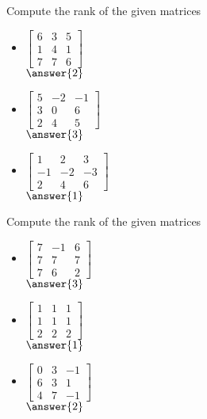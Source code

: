 \documentclass{ximera}
\begin{document}
\begin{exercise} \label{exercise:rankmatrix}
    Compute the rank of the given matrices
    \begin{itemize}
        \item
        $\begin{bmatrix}
            6 & 3 & 5 \\
            1 & 4 & 1 \\
            7 & 7 & 6
        \end{bmatrix}$\\ 
        $\answer{2}$
        \item
        $\begin{bmatrix}
            5 & -2 & -1 \\
            3 & 0 & 6 \\
            2 & 4 & 5
        \end{bmatrix}$\\ 
        $\answer{3}$
        \item
        $\begin{bmatrix}
            1 & 2 & 3 \\
            -1 & -2 & -3 \\
            2 & 4 & 6
        \end{bmatrix}$\\ 
        $\answer{1}$
    \end{itemize}
\end{exercise}

\begin{exercise} \label{exercise:rankmatrixans}%
    Compute the rank of the given matrices
    \begin{itemize}
        \item
        $\begin{bmatrix}
            7 & -1 & 6 \\
            7 & 7 & 7 \\
            7 & 6 & 2
        \end{bmatrix}$\\ 
        $\answer{3}$
        \item
        $\begin{bmatrix}
            1 & 1 & 1 \\
            1 & 1 & 1 \\
            2 & 2 & 2
        \end{bmatrix}$\\ 
        $\answer{1}$
        \item
        $\begin{bmatrix}
            0 & 3 & -1 \\
            6 & 3 & 1 \\
            4 & 7 & -1
        \end{bmatrix}$\\ 
        $\answer{2}$
    \end{itemize}
\end{exercise}
\end{document}
